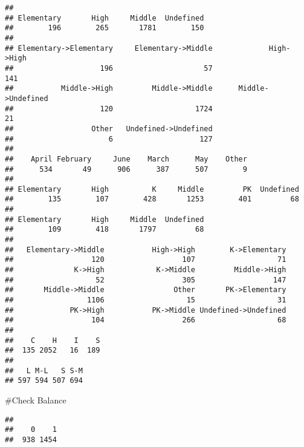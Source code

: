 \documentclass[
]{article}
\newenvironment{Shaded}{\begin{snugshade}}{\end{snugshade}}
\newcommand{\CommentTok}[1]{\textcolor[rgb]{0.56,0.35,0.01}{\textit{#1}}}
\newcommand{\FloatTok}[1]{\textcolor[rgb]{0.00,0.00,0.81}{#1}}
\newcommand{\FunctionTok}[1]{\textcolor[rgb]{0.13,0.29,0.53}{\textbf{#1}}}
\newcommand{\NormalTok}[1]{#1}
\newcommand{\SpecialCharTok}[1]{\textcolor[rgb]{0.81,0.36,0.00}{\textbf{#1}}}
\begin{document}
\begin{verbatim}
## 
## Elementary       High     Middle  Undefined 
##        196        265       1781        150 
## 
## Elementary->Elementary     Elementary->Middle             High->High 
##                    196                     57                    141 
##           Middle->High         Middle->Middle      Middle->Undefined 
##                    120                   1724                     21 
##                  Other   Undefined->Undefined 
##                      6                    127 
## 
##    April February     June    March      May    Other 
##      534       49      906      387      507        9 
## 
## Elementary       High          K     Middle         PK  Undefined 
##        135        107        428       1253        401         68 
## 
## Elementary       High     Middle  Undefined 
##        109        418       1797         68 
## 
##   Elementary->Middle           High->High        K->Elementary 
##                  120                  107                   71 
##              K->High            K->Middle         Middle->High 
##                   52                  305                  147 
##       Middle->Middle                Other       PK->Elementary 
##                 1106                   15                   31 
##             PK->High           PK->Middle Undefined->Undefined 
##                  104                  266                   68 
## 
##    C    H    I    S 
##  135 2052   16  189 
## 
##   L M-L   S S-M 
## 597 594 507 694
\end{verbatim}

\#Check Balance

\begin{Shaded}
\end{Shaded}

\begin{verbatim}
## 
##    0    1 
##  938 1454
\end{verbatim}

\begin{Shaded}
\end{Shaded}
\end{document}

